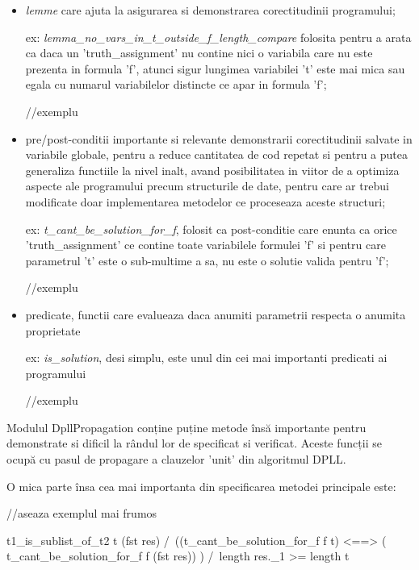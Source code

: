 {\begin{itemize}
	ex: \textit{get\_clause\_value }- returneaza valoarea de adevar a unei clauze considerand un 'truth\_assignment' primit ca parametru;
	
	\item \textit{lemme} care ajuta la asigurarea si demonstrarea corectitudinii programului;
	
	ex: \textit{lemma\_no\_vars\_in\_t\_outside\_f\_length\_compare} folosita pentru a arata ca daca un 'truth\_assignment' nu contine nici o variabila care nu este prezenta in formula 'f', atunci sigur lungimea variabilei 't' este mai mica sau egala cu numarul variabilelor distincte ce apar in formula 'f';
	
	//exemplu
	
	\item pre/post-conditii importante si relevante demonstrarii corectitudinii salvate in variabile globale, pentru a reduce cantitatea de cod repetat si pentru a putea generaliza functiile la nivel inalt, avand posibilitatea in viitor de a optimiza aspecte ale programului precum structurile de date, pentru care ar trebui modificate doar implementarea metodelor ce proceseaza aceste structuri;
	
	ex: \textit{t\_cant\_be\_solution\_for\_f}, folosit ca post-conditie care enunta ca orice 'truth\_assignment' ce contine toate variabilele formulei 'f' si pentru care parametrul 't' este o sub-multime a sa, nu este o solutie valida pentru 'f';
	
	//exemplu
	
	
	\item predicate, functii care evalueaza daca anumiti parametrii respecta o anumita proprietate
	
	ex: \textit{is\_solution}, desi simplu, este unul din cei mai importanti predicati ai programului
	
	//exemplu
	
\end{itemize}


Modulul DpllPropagation conține puține metode însă importante pentru demonstrate si dificil la rândul lor de specificat si verificat. Aceste funcții se ocupă cu pasul de propagare a clauzelor 'unit' din algoritmul DPLL.

O mica parte însa cea mai importanta din specificarea metodei principale este:

//aseaza exemplul mai frumos

 t1\_is\_sublist\_of\_t2 t (fst res)
	/\ ((t\_cant\_be\_solution\_for\_f f t) <==> ( t\_cant\_be\_solution\_for\_f f (fst res)) )
	/\ length res.\_1 >= length t
	
}
